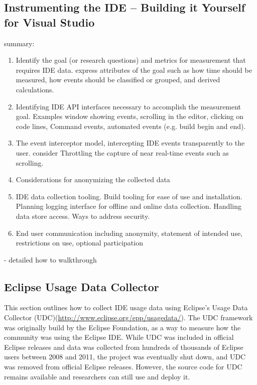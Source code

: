 \subsection{Instrumenting the IDE -- Building it Yourself for Visual Studio} %
\label{buildItYourself}
 summary:
\begin{enumerate}
	\item
	Identify the goal (or research questions) and metrics for measurement that requires IDE data.  express attributes of the goal such as how time should be measured, how events should be classified or grouped, and derived calculations.
	\item
	Identifying  IDE API interfaces necessary to accomplish the measurement goal.  Examples window showing events, scrolling in the editor, clicking on code lines, Command events, automated events (e.g. build begin and end).
	\item
	The event interceptor model, intercepting IDE events transparently to the user.  consider Throttling the capture of near real-time events such as scrolling.
	\item
	Considerations for anonymizing the collected data
	\item
	IDE data collection tooling.  Build tooling for ease of use and installation.  Planning logging interface for offline and online data collection.  Handling data store access.  Ways to address security.
	\item
	End user communication including anonymity, statement of intended use, restrictions on use, optional participation
	
\end{enumerate}
- detailed how to walkthrough

\subsection{Eclipse Usage Data Collector}

This section outlines how to collect IDE usage data using Eclipse's Usage Data Collector (UDC)(\url{http://www.eclipse.org/epp/usagedata/}).
The UDC framework was originally build by the Eclipse Foundation, as a way to measure how the
community was using the Eclipse IDE.
While UDC was included in official Eclipse releases and data was collected from
hundreds of thousands of Eclipse users between 2008 and 2011, the project was eventually shut down,
and UDC was removed from official Eclipse releases.
However, the source code for UDC remains available and researchers can still use and deploy it.


